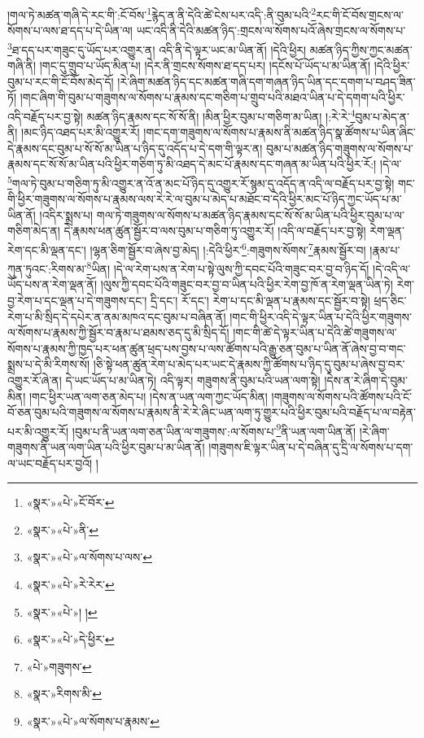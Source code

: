 །གལ་ཏེ་མཚན་གཞི་དེ་རང་གི་:ངོ་བོས་\footnote{«སྣར་»«པེ་»ངོ་བོར་}རྙེད་ན་ནི་དེའི་ཚེ་ངེས་པར་འདི་:ནི་བུམ་པའི་\footnote{«སྣར་»«པེ་»ནི་}རང་གི་ངོ་བོས་གྲངས་ལ་སོགས་པ་ལས་ཐ་དད་པ་དེ་ཡིན་ལ། ཡང་འདི་ནི་དེའི་མཚན་ཉིད་:གྲངས་ལ་སོགས་པའོ་ཞེས་གྲངས་ལ་སོགས་པ་\footnote{«སྣར་»«པེ་»ལ་སོགས་པ་ལས་}ཐ་དད་པར་གཟུང་དུ་ཡོད་པར་འགྱུར་ན། འདི་ནི་དེ་ལྟར་ཡང་མ་ཡིན་ནོ། །དེའི་ཕྱིར། མཚན་ཉིད་ཀྱིས་ཀྱང་མཚན་གཞི་ནི། །གང་དུ་གྲུབ་པ་ཡོད་མིན་པ། །དེར་ནི་གྲངས་སོགས་ཐ་དད་པར། །དངོས་པོ་ཡོད་པ་མ་ཡིན་ནོ། །དེའི་ཕྱིར་བུམ་པ་རང་གི་ངོ་བོས་མེད་དོ། །རེ་ཞིག་མཚན་ཉིད་དང་མཚན་གཞི་དག་གཞན་ཉིད་ཡིན་དང་དགག་པ་བཤད་ཟིན་ཏོ། །གང་ཞིག་གི་བུམ་པ་གཟུགས་ལ་སོགས་པ་རྣམས་དང་གཅིག་པ་གྲུབ་པའི་མཐའ་ཡིན་པ་དེ་དགག་པའི་ཕྱིར་འདི་བརྗོད་པར་བྱ་སྟེ། མཚན་ཉིད་རྣམས་དང་སོ་སོ་ནི། །མིན་ཕྱིར་བུམ་པ་གཅིག་མ་ཡིན། །:རེ་རེ་\footnote{«སྣར་»«པེ་»རེ་རེར་}བུམ་པ་མེད་ན་ནི། །མང་ཉིད་འཐད་པར་མི་འགྱུར་རོ། །གང་དག་གཟུགས་ལ་སོགས་པ་རྣམས་ནི་མཚན་ཉིད་སྣ་ཚོགས་པ་ཡིན་ཞིང་དེ་རྣམས་དང་བུམ་པ་སོ་སོ་མ་ཡིན་པ་ཉིད་དུ་འདོད་པ་དེ་དག་གི་ལྟར་ན། བུམ་པ་མཚན་ཉིད་གཟུགས་ལ་སོགས་པ་རྣམས་དང་སོ་སོ་མ་ཡིན་པའི་ཕྱིར་གཅིག་ཏུ་མི་འཐད་དེ་མང་པོ་རྣམས་དང་གཞན་མ་ཡིན་པའི་ཕྱིར་རོ:། །དེ་ལ་\footnote{«སྣར་»«པེ་»། །}གལ་ཏེ་བུམ་པ་གཅིག་ཏུ་མི་འགྱུར་ན་འོ་ན་མང་པོ་ཉིད་དུ་འགྱུར་རོ་སྙམ་དུ་འདོད་ན་འདི་ལ་བརྗོད་པར་བྱ་སྟེ། གང་གི་ཕྱིར་གཟུགས་ལ་སོགས་པ་རྣམས་ལས་རེ་རེ་ལ་བུམ་པ་མེད་པ་མཐོང་བ་དེའི་ཕྱིར་མང་པོ་ཉིད་ཀྱང་ཡོད་པ་མ་ཡིན་ནོ། །འདིར་སྨྲས་པ། གལ་ཏེ་གཟུགས་ལ་སོགས་པ་མཚན་ཉིད་རྣམས་དང་སོ་སོ་མ་ཡིན་པའི་ཕྱིར་བུམ་པ་ལ་གཅིག་མེད་ན། དེ་རྣམས་ཕན་ཚུན་སྦྱོར་བ་ལས་བུམ་པ་གཅིག་ཏུ་འགྱུར་རོ། །འདི་ལ་བརྗོད་པར་བྱ་སྟེ། རེག་ལྡན་རེག་དང་མི་ལྡན་དང་། །ལྷན་ཅིག་སྦྱོར་བ་ཞེས་བྱ་མེད། །:དེའི་ཕྱིར་\footnote{«སྣར་»«པེ་»དེ་ཕྱིར་}:གཟུགས་སོགས་\footnote{«པེ་»གཟུགས་}རྣམས་སྦྱོར་བ། །རྣམ་པ་ཀུན་ཏུའང་:རིགས་མ་\footnote{«སྣར་»རིགས་མི་}ཡིན། །དེ་ལ་རེག་པས་ན་རེག་པ་སྟེ་ལུས་ཀྱི་དབང་པོའི་གཟུང་བར་བྱ་བ་ཉིད་དོ། །དེ་འདི་ལ་ཡོད་པས་ན་རེག་ལྡན་ནོ། །ལུས་ཀྱི་དབང་པོའི་གཟུང་བར་བྱ་བ་ཡིན་པའི་ཕྱིར་རེག་བྱ་ཁོ་ན་རེག་ལྡན་ཡིན་ཏེ། རེག་བྱ་རེག་པ་དང་ལྡན་པ་དེ་གཟུགས་དང་། དྲི་དང་། རོ་དང་། རེག་པ་དང་མི་ལྡན་པ་རྣམས་དང་སྦྱོར་བ་སྟེ། ཕྲད་ཅིང་རེག་པ་མི་སྲིད་དེ་དཔེར་ན་ནམ་མཁའ་དང་བུམ་པ་བཞིན་ནོ། །གང་གི་ཕྱིར་འདི་དེ་ལྟར་ཡིན་པ་དེའི་ཕྱིར་གཟུགས་ལ་སོགས་པ་རྣམས་ཀྱི་སྦྱོར་བ་རྣམ་པ་ཐམས་ཅད་དུ་མི་སྲིད་དོ། །གང་གི་ཚེ་དེ་ལྟར་ཡིན་པ་དེའི་ཚེ་གཟུགས་ལ་སོགས་པ་རྣམས་ཀྱི་ཁྱད་པར་ཕན་ཚུན་ཕྲད་པས་བྱས་པ་ལས་ཚོགས་པའི་རྒྱུ་ཅན་བུམ་པ་ཡིན་ནོ་ཞེས་བྱ་བ་གང་སྨྲས་པ་དེ་མི་རིགས་སོ། །ཅི་སྟེ་ཕན་ཚུན་རེག་པ་མེད་པར་ཡང་དེ་རྣམས་ཀྱི་ཚོགས་པ་ཉིད་དུ་བུམ་པ་ཞེས་བྱ་བར་འགྱུར་རོ་ཞེ་ན། དེ་ཡང་ཡོད་པ་མ་ཡིན་ཏེ། འདི་ལྟར། གཟུགས་ནི་བུམ་པའི་ཡན་ལག་སྟེ། །དེས་ན་རེ་ཞིག་དེ་བུམ་མིན། །གང་ཕྱིར་ཡན་ལག་ཅན་མེད་པ། །དེས་ན་ཡན་ལག་ཀྱང་ཡོད་མིན། །གཟུགས་ལ་སོགས་པའི་ཚོགས་པའི་ངོ་བོ་ཅན་བུམ་པའི་གཟུགས་ལ་སོགས་པ་རྣམས་ནི་རེ་རེ་ཞིང་ཡན་ལག་ཏུ་གྱུར་པའི་ཕྱིར་བུམ་པའི་བརྗོད་པ་ལ་བརྟེན་པར་མི་འགྱུར་རོ། །བུམ་པ་ནི་ཡན་ལག་ཅན་ཡིན་ལ་གཟུགས་:ལ་སོགས་པ་\footnote{«སྣར་»«པེ་»ལ་སོགས་པ་རྣམས་}ནི་ཡན་ལག་ཡིན་ནོ། །རེ་ཞིག་གཟུགས་ནི་ཡན་ལག་ཡིན་པའི་ཕྱིར་བུམ་པ་མ་ཡིན་ནོ། །གཟུགས་ཇི་ལྟར་ཡིན་པ་དེ་བཞིན་དུ་དྲི་ལ་སོགས་པ་དག་ལ་ཡང་བརྗོད་པར་བྱའོ། །
